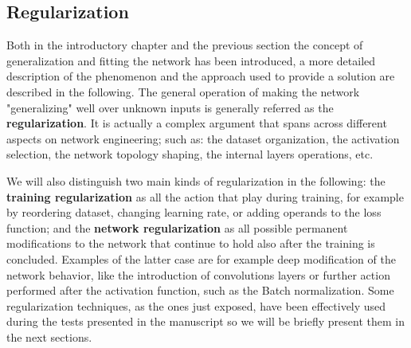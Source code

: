 
\subsection{Regularization}
\label{section:training_regularization}
Both in the introductory chapter and the previous section the concept of generalization and fitting the network has been introduced, a more detailed description of the phenomenon and the approach used to provide a solution are described in the following.
The general operation of making the network "generalizing" well over unknown inputs is generally referred as the \textbf{regularization}. It is actually a complex argument that spans across different aspects on network engineering; such as: the dataset organization, the activation selection, the network topology shaping, the internal layers operations, etc. 

We will also distinguish two main kinds of regularization in the following: the \textbf{training regularization} as all the action that play during training, for example by reordering dataset, changing learning rate, or adding operands to the loss function; and the \textbf{network regularization} as all possible permanent modifications to the network that continue to hold also after the training is concluded. Examples of the latter case are for example deep modification of the network behavior, like the introduction of convolutions layers or further action performed after the activation function, such as the Batch normalization. 
Some regularization techniques, as the ones just exposed, have been effectively used during the tests presented in the manuscript so we will be briefly present them in the next sections.

